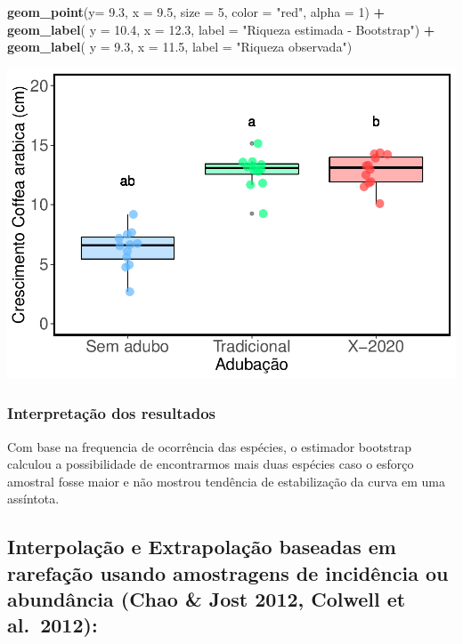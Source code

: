 \documentclass[
]{book}
\newenvironment{Shaded}{\begin{snugshade}}{\end{snugshade}}
\newcommand{\DataTypeTok}[1]{\textcolor[rgb]{0.13,0.29,0.53}{#1}}
\newcommand{\DecValTok}[1]{\textcolor[rgb]{0.00,0.00,0.81}{#1}}
\newcommand{\FloatTok}[1]{\textcolor[rgb]{0.00,0.00,0.81}{#1}}
\newcommand{\KeywordTok}[1]{\textcolor[rgb]{0.13,0.29,0.53}{\textbf{#1}}}
\newcommand{\NormalTok}[1]{#1}
\newcommand{\OperatorTok}[1]{\textcolor[rgb]{0.81,0.36,0.00}{\textbf{#1}}}
\newcommand{\StringTok}[1]{\textcolor[rgb]{0.31,0.60,0.02}{#1}}
\begin{document}
\begin{Shaded}
\begin{Highlighting}[]
\StringTok{  }\KeywordTok{geom_point}\NormalTok{(}\DataTypeTok{y=} \FloatTok{9.3}\NormalTok{, }\DataTypeTok{x =} \FloatTok{9.5}\NormalTok{, }\DataTypeTok{size =} \DecValTok{5}\NormalTok{, }\DataTypeTok{color =} \StringTok{"red"}\NormalTok{, }\DataTypeTok{alpha =} \DecValTok{1}\NormalTok{) }\OperatorTok{+}\StringTok{ }
\StringTok{  }\KeywordTok{geom_label}\NormalTok{( }\DataTypeTok{y =} \FloatTok{10.4}\NormalTok{, }\DataTypeTok{x =} \FloatTok{12.3}\NormalTok{, }\DataTypeTok{label =} \StringTok{"Riqueza estimada - Bootstrap"}\NormalTok{) }\OperatorTok{+}
\StringTok{  }\KeywordTok{geom_label}\NormalTok{( }\DataTypeTok{y =} \FloatTok{9.3}\NormalTok{, }\DataTypeTok{x =} \FloatTok{11.5}\NormalTok{, }\DataTypeTok{label =} \StringTok{"Riqueza observada"}\NormalTok{)}
\end{Highlighting}
\end{Shaded}

\includegraphics{livro_r_ecologia_files/figure-latex/unnamed-chunk-15-1.pdf}

\hypertarget{interpretauxe7uxe3o-dos-resultados-7}{%
\subsubsection{Interpretação dos resultados}\label{interpretauxe7uxe3o-dos-resultados-7}}

Com base na frequencia de ocorrência das espécies, o estimador bootstrap calculou a possibilidade de encontrarmos mais duas espécies caso o esforço amostral fosse maior e não mostrou tendência de estabilização da curva em uma assíntota.

\hypertarget{interpolauxe7uxe3o-e-extrapolauxe7uxe3o-baseadas-em-rarefauxe7uxe3o-usando-amostragens-de-inciduxeancia-ou-abunduxe2ncia-chao-jost-2012-colwell-et-al.-2012}{%
\subsection{Interpolação e Extrapolação baseadas em rarefação usando amostragens de incidência ou abundância (Chao \& Jost 2012, Colwell et al.~2012):}\label{interpolauxe7uxe3o-e-extrapolauxe7uxe3o-baseadas-em-rarefauxe7uxe3o-usando-amostragens-de-inciduxeancia-ou-abunduxe2ncia-chao-jost-2012-colwell-et-al.-2012}}
\end{document}
